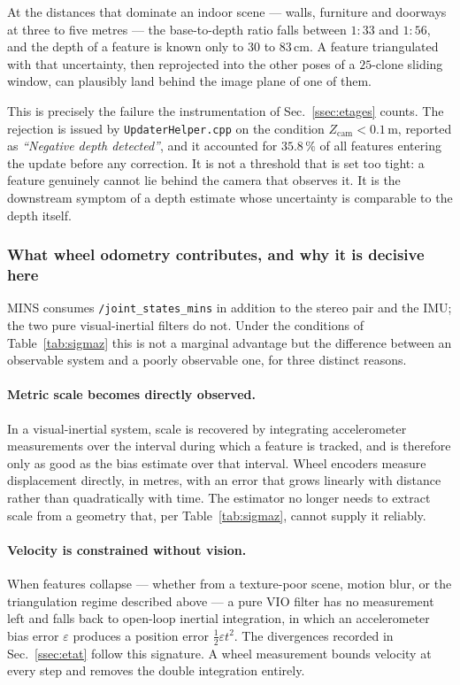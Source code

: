 At the distances that dominate an indoor scene --- walls, furniture and
doorways at three to five metres --- the base-to-depth ratio falls between
$1{:}33$ and $1{:}56$, and the depth of a feature is known only to $30$ to
$83\,\mathrm{cm}$. A feature triangulated with that uncertainty, then
reprojected into the other poses of a $25$-clone sliding window, can plausibly
land behind the image plane of one of them.

This is precisely the failure the instrumentation of Sec.~\ref{ssec:etages}
counts. The rejection is issued by \texttt{UpdaterHelper.cpp} on the condition
$Z_{\mathrm{cam}} < 0.1\,\mathrm{m}$, reported as \emph{``Negative depth
detected''}, and it accounted for $35.8\,\%$ of all features entering the
update before any correction. It is not a threshold that is set too tight: a
feature genuinely cannot lie behind the camera that observes it. It is the
downstream symptom of a depth estimate whose uncertainty is comparable to the
depth itself.

\subsubsection{What wheel odometry contributes, and why it is decisive here}

MINS consumes \texttt{/joint\_states\_mins} in addition to the stereo pair and
the IMU; the two pure visual-inertial filters do not. Under the conditions of
Table~\ref{tab:sigmaz} this is not a marginal advantage but the difference
between an observable system and a poorly observable one, for three distinct
reasons.

\paragraph{Metric scale becomes directly observed.} In a visual-inertial
system, scale is recovered by integrating accelerometer measurements over the
interval during which a feature is tracked, and is therefore only as good as
the bias estimate over that interval. Wheel encoders measure displacement
directly, in metres, with an error that grows linearly with distance rather
than quadratically with time. The estimator no longer needs to extract scale
from a geometry that, per Table~\ref{tab:sigmaz}, cannot supply it reliably.

\paragraph{Velocity is constrained without vision.} When features collapse ---
whether from a texture-poor scene, motion blur, or the triangulation regime
described above --- a pure VIO filter has no measurement left and falls back
to open-loop inertial integration, in which an accelerometer bias error
$\varepsilon$ produces a position error $\tfrac{1}{2}\varepsilon t^{2}$. The
divergences recorded in Sec.~\ref{ssec:etat} follow this signature. A wheel
measurement bounds velocity at every step and removes the double integration
entirely.

